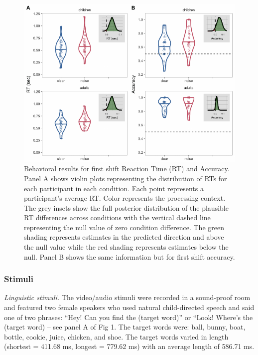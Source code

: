 \documentclass[10pt, letterpaper]{article}
\newenvironment{CodeChunk}{}{}
\begin{document}
\begin{CodeChunk}
\begin{figure}[t]

{\centering \includegraphics[width=0.9\linewidth]{figs/noise_acc_rt_e1_plot-1} 

}

\caption[Behavioral results for first shift Reaction Time (RT) and Accuracy]{Behavioral results for first shift Reaction Time (RT) and Accuracy. Panel A shows violin plots representing the distribution of RTs for each participant in each condition. Each point represents a participant's average RT. Color represents the processing context. The grey insets show the full posterior distribution of the plausible RT differences across conditions with the vertical dashed line representing the null value of zero condition difference. The green shading represents estimates in the predicted direction and above the null value while the red shading represents estimates below the null. Panel B shows the same information but for first shift accuracy.}\label{fig:noise_acc_rt_e1_plot}
\end{figure}
\end{CodeChunk}

\subsubsection{Stimuli}\label{stimuli}

\emph{Linguistic stimuli.} The video/audio stimuli were recorded in a
sound-proof room and featured two female speakers who used natural
child-directed speech and said one of two phrases: ``Hey! Can you find
the (target word)'' or ``Look! Where's the (target word) -- see panel A
of Fig 1. The target words were: ball, bunny, boat, bottle, cookie,
juice, chicken, and shoe. The target words varied in length (shortest =
411.68 ms, longest = 779.62 ms) with an average length of 586.71 ms.
\end{document}
